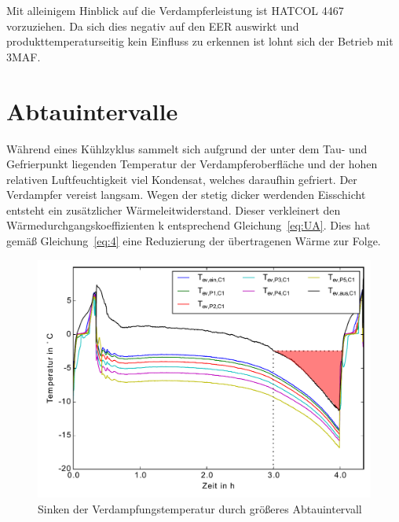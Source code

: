 Mit alleinigem Hinblick auf die Verdampferleistung ist HATCOL 4467 vorzuziehen.
Da sich dies negativ auf den EER auswirkt und produkttemperaturseitig kein Einfluss zu erkennen ist lohnt sich der Betrieb mit 3MAF.










\clearpage




\section{Abtauintervalle}
\label{sec:Abtauintervalle}


Während eines Kühlzyklus sammelt sich aufgrund der unter dem Tau- und Gefrierpunkt liegenden Temperatur der Verdampferoberfläche und der hohen relativen Luftfeuchtigkeit viel Kondensat, welches daraufhin gefriert. Der Verdampfer vereist langsam. Wegen der stetig dicker werdenden Eisschicht entsteht ein zusätzlicher Wärmeleitwiderstand. Dieser verkleinert den Wärmedurchgangskoeffizienten k entsprechend Gleichung~\ref{eq:UA}. Dies hat gemäß Gleichung~\ref{eq:4} eine Reduzierung der übertragenen Wärme zur Folge.




\begin{figure}[h!]
\centering
\includegraphics[scale=0.8]{Pictures/50evaploss.pdf}
\caption{Sinken der Verdampfungstemperatur durch größeres Abtauintervall}
\label{fig:SinkenVerdampfung4h3h}
\end{figure}

